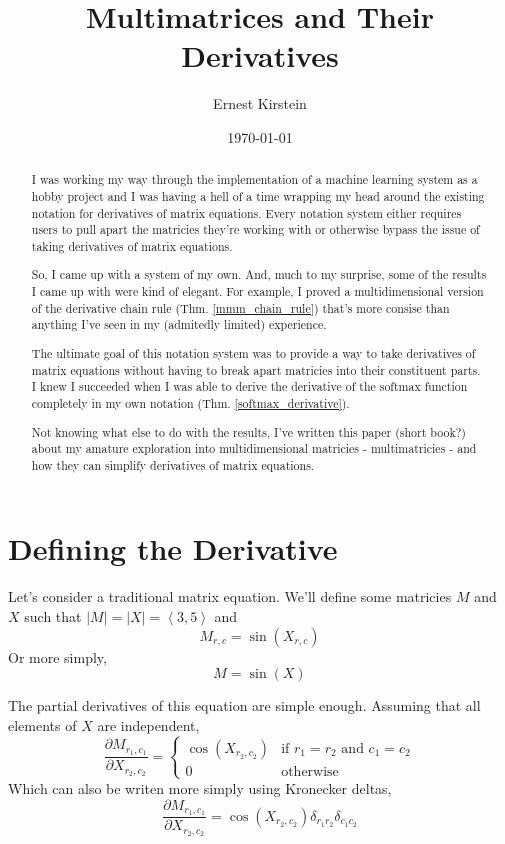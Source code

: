\documentclass[12pt]{article}
\title{Multimatrices and Their Derivatives}
\author{Ernest Kirstein}
\date{\today}
\theoremstyle{definition}
\theoremstyle{plain}
\theoremstyle{ppart}
\begin{document}
\maketitle

\begin{abstract}
I was working my way through the implementation of a machine learning system as
a hobby project and I was having a hell of a time wrapping my head around the
existing notation for derivatives of matrix equations. Every notation system
either requires users to pull apart the matricies they're working with or otherwise
bypass the issue of taking derivatives of matrix equations.

So, I came up with a system of my own. And, much to my surprise, some of the
results I came up with were kind of elegant. For example, I proved a
multidimensional version of the derivative chain rule (Thm. \ref{mmm_chain_rule})
that's more consise than anything I've seen in my (admitedly limited) experience.

The ultimate goal of this notation system was to provide a way to take derivatives
of matrix equations without having to break apart matricies into their constituent
parts. I knew I succeeded when I was able to derive the derivative of the softmax
function completely in my own notation (Thm. \ref{softmax_derivative}).

Not knowing what else to do with the results, I've written this paper (short book?)
about my amature exploration into multidimensional matricies -
multimatricies - and how they can simplify derivatives of matrix equations.
\end{abstract}

\newpage

\tableofcontents

\newpage

\section{Defining the Derivative}

Let's consider a traditional matrix equation.
We'll define some matricies $M$ and $X$ such that
$|M| = |X| = \left< 3,5 \right>$
and \[M_{r,c} = \sin(X_{r,c})\]
Or more simply, \[M = \sin(X)\]

\noindent
The partial derivatives of this equation are simple enough. Assuming that all elements
of $X$ are independent,
\[
\frac{\partial M_{r_1,c_1}}{\partial X_{r_2,c_2}} = 
\left\{
  \begin{array}{ll}
    \cos(X_{r_2,c_2})  & \mbox{if } r_1 = r_2 \mbox{ and } c_1 = c_2 \\
    0 & \mbox{otherwise}
  \end{array}
\right.
\]
Which can also be writen more simply using Kronecker deltas,
\[
\frac{\partial M_{r_1,c_1}}{\partial X_{r_2,c_2}} = 
\cos (X_{r_2, c_2}) \delta_{r_1 r_2} \delta_{c_1 c_2}
\]
\end{document}
